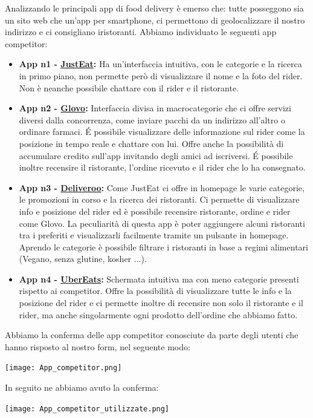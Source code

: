 \documentclass{article}
\begin{document}
     \par
    Analizzando le principali app di food delivery è emerso che: tutte posseggono sia un sito web che un'app per smartphone, ci permettono di geolocalizzare il nostro indirizzo e ci consigliano iristoranti.
    Abbiamo individuato le seguenti app competitor:
\begin{itemize}
        \item \textbf{App n1 - \href{https://www.justeat.it}{JustEat}:} Ha un’interfaccia intuitiva, con le categorie e la ricerca in primo piano, non permette però di visualizzare il nome e la foto del rider. Non è neanche possibile chattare con il rider e il ristorante.

        \item \textbf{App n2 - \href{https://glovoapp.com/it/it/}{Glovo}:} Interfaccia divisa in macrocategorie che ci offre servizi diversi dalla concorrenza, come inviare pacchi da un indirizzo all’altro o ordinare farmaci. É possibile visualizzare delle informazione sul rider come la posizione in tempo reale e chattare con lui. Offre anche la possibilità di accumulare credito sull’app invitando degli amici ad iscriversi. É possibile inoltre recensire il ristorante, l’ordine ricevuto e il rider che lo ha consegnato.

        \item \textbf{App n3 - \href{https://deliveroo.it/it/}{Deliveroo}:} Come JustEat ci offre in homepage le varie categorie, le promozioni in corso e la ricerca dei ristoranti. Ci permette di visualizzare info e posizione del rider ed è possibile recensire ristorante, ordine e rider come Glovo. La peculiarità di questa app è poter aggiungere alcuni ristoranti tra i preferiti e visualizzarli facilmente tramite un pulsante in homepage. Aprendo le categorie è possibile filtrare i ristoranti in base a regimi alimentari (Vegano, senza glutine, kosher ...).

        \item \textbf{App n4 - \href{https://www.ubereats.com/it/}{UberEats}:} Schermata intuitiva ma con meno categorie presenti rispetto ai competitor. Offre la possibilità di visualizzare tutte le info e la posizione del rider e ci permette inoltre di recensire non solo il ristorante e il rider, ma anche singolarmente ogni prodotto dell’ordine che abbiamo fatto.

\end{itemize}
Abbiamo la conferma delle app competitor conosciute da parte degli utenti che hanno risposto al nostro form, nel seguente modo:
\begin{center}
   \texttt{[image: App\_competitor.png]} 
\end{center}
\par In seguito ne abbiamo avuto la conferma:
\begin{center}
    \texttt{[image: App\_competitor\_utilizzate.png]}
\end{center}
\end{document}
